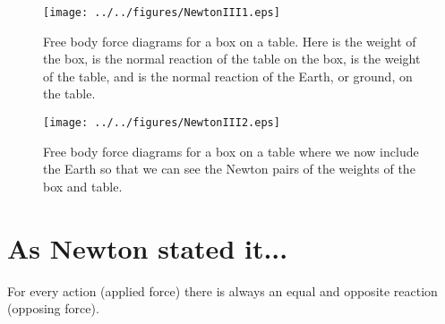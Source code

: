 





\addtolength{\topmargin}{-0.7 cm}
\setlength{\columnsep}{22pt}

\begin{wrapfigure}{r}{8cm}\vspace{-1.5 cm}
\center
\texttt{[image: ../../figures/NewtonIII1.eps]}
\caption{Free body force diagrams for a box on a table. Here  is the weight of the box,  is the normal reaction of the table on the box,  is the weight of the table, and  is the normal reaction of the Earth, or ground, on the table.} \label{NIII1}
\center
\texttt{[image: ../../figures/NewtonIII2.eps]}
\caption{Free body force diagrams for a box on a table where we now include the Earth so that we can see the Newton pairs of the weights of the box and table.} \label{NIII2}
\end{wrapfigure}

\section{As Newton stated it...}
For every action (applied force) there is always an equal and opposite reaction (opposing force).


